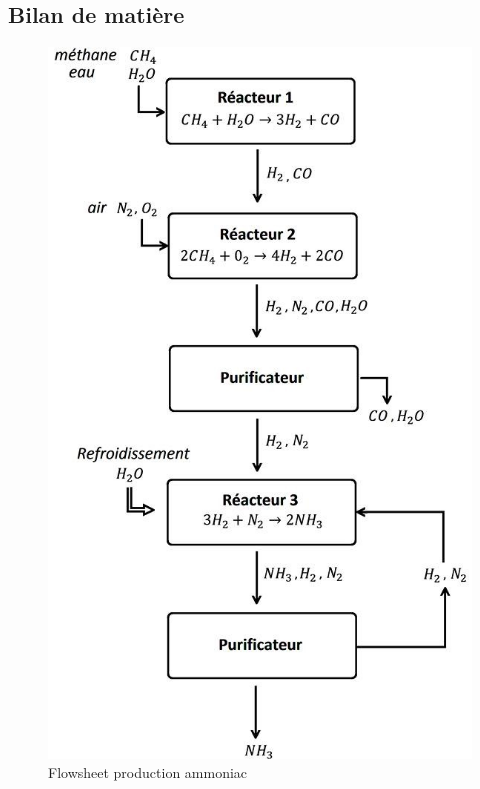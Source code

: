 \documentclass[11pt,a4paper]{report}
\begin{document}
\subsection*{Bilan de matière}
\begin{figure}[ht!]
 \centering
 \includegraphics[scale=0.4]{flowsheet.jpg}
 \caption{Flowsheet production ammoniac}
 \label{scheme}
 
\end{figure}
\end{document}
